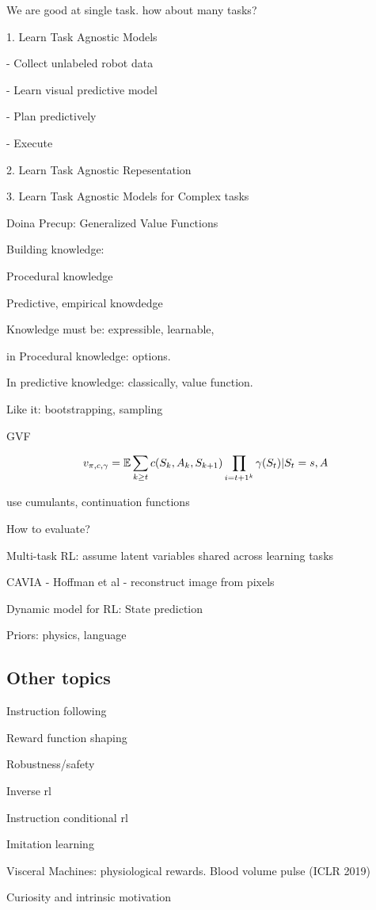 \documentclass[english]{article}
\begin{document}
We are good at single task. how about many tasks?

1. Learn Task Agnostic Models

- Collect unlabeled robot data

- Learn visual predictive model

- Plan predictively

- Execute

2. Learn Task Agnostic Repesentation

3. Learn Task Agnostic Models for Complex tasks

\item Doina Precup: Generalized Value Functions

Building knowledge:

Procedural knowledge

Predictive, empirical knowdedge

Knowledge must be: expressible, learnable, 

in Procedural knowledge: options.

In predictive knowledge: classically, value function.

Like it: bootstrapping, sampling

GVF

$$
v_{\pi,c,\gamma}
= 
\mathbb{E}
\sum_{k\ge t}
c(S_k,A_k,S_{k+1})
\prod_{i=t+1^k}
\gamma(S_{t})|
S_t=s,
A
$$

use cumulants, continuation functions

How to evaluate?

\item Multi-task RL: assume latent variables shared across learning tasks

CAVIA - Hoffman et al - reconstruct image from pixels

\item 

Dynamic model for RL: State prediction

Priors: physics, language

\eenum

\subsection{Other topics}
%
\benum
\item Instruction following
\item Reward function shaping
\item Robustness/safety
\item  Inverse rl
\item Instruction conditional rl
\item  Imitation learning
\item Visceral Machines: physiological rewards. Blood volume pulse (ICLR 2019)
\item Curiosity and intrinsic motivation
\end{document}
